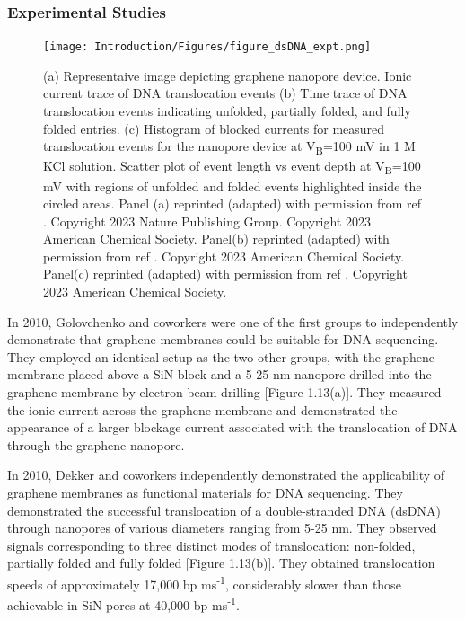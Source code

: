 \subsubsection{Experimental Studies}
\begin{figure}[!h]
    \centering
    \texttt{[image: Introduction/Figures/figure\_dsDNA\_expt.png]}
    \caption[Results from dsDNA - graphene nanopore experiments]{(a) Representaive image depicting graphene nanopore device. Ionic current trace of DNA translocation events (b) Time trace of DNA translocation events indicating unfolded, partially folded, and fully folded entries. (c) Histogram of blocked currents for measured translocation events for the nanopore device at V\textsubscript{B}=100 mV in 1 M KCl solution. Scatter plot of event length vs event depth at V\textsubscript{B}=100 mV with regions of unfolded and folded events highlighted inside the circled areas. Panel (a) reprinted (adapted) with permission from ref \supercite{garaj_graphene_2010}. Copyright 2023 Nature Publishing Group. Copyright 2023 American Chemical Society. Panel(b) reprinted (adapted) with permission from ref \supercite{schneider_dna_2010}. Copyright 2023 American Chemical Society. Panel(c) reprinted (adapted) with permission from ref \supercite{merchant_dna_2010}. Copyright 2023 American Chemical Society.}
    \label{fig:figure13}
\end{figure}

In 2010, Golovchenko and coworkers were one of the first groups to independently demonstrate that graphene membranes could be suitable for DNA sequencing.\supercite{garaj_graphene_2010} They employed an identical setup as the two other groups, with the graphene membrane placed above a SiN block and a 5-25 nm nanopore drilled into the graphene membrane by electron-beam drilling [Figure 1.13(a)]. They measured the ionic current across the graphene membrane and demonstrated the appearance of a larger blockage current associated with the translocation of DNA through the graphene nanopore.

In 2010, Dekker and coworkers independently demonstrated the applicability of graphene membranes as functional materials for DNA sequencing.\supercite{schneider_dna_2010} They demonstrated the successful translocation of a double-stranded DNA (dsDNA) through nanopores of various diameters ranging from 5-25 nm. They observed signals corresponding to three distinct modes of translocation: non-folded, partially folded and fully folded [Figure 1.13(b)]. They obtained translocation speeds of approximately 17,000 bp ms\textsuperscript{-1}, considerably slower than those achievable in SiN pores at 40,000 bp ms\textsuperscript{-1}.

